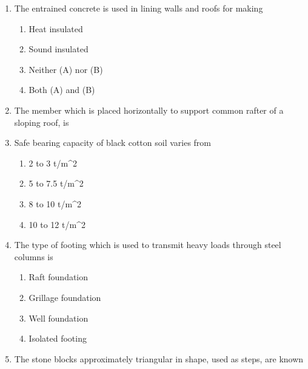 \documentclass[11pt,a4paper]{article}
\begin{document}
\begin{enumerate}
\item{The entrained concrete is used in lining walls and roofs for making}
\begin{enumerate}[label=\Alph*.]
\item{Heat insulated}
\item{Sound insulated}
\item{Neither (A) nor (B)}
\item{Both (A) and (B)}
\end{enumerate}
\item{The member which is placed horizontally to support common rafter of a sloping roof, is}
\\
\item{Safe bearing capacity of black cotton soil varies from}
\begin{enumerate}[label=\Alph*.]
\item{2 to 3 t/m\^{}2}
\item{5 to 7.5 t/m\^{}2}
\item{8 to 10 t/m\^{}2}
\item{10 to 12 t/m\^{}2}
\end{enumerate}
\item{The type of footing which is used to transmit heavy loads through steel columns is}
\begin{enumerate}[label=\Alph*.]
\item{Raft foundation}
\item{Grillage foundation}
\item{Well foundation}
\item{Isolated footing}
\end{enumerate}
\item{The stone blocks approximately triangular in shape, used as steps, are known}
\\
\end{enumerate}
\end{document}
